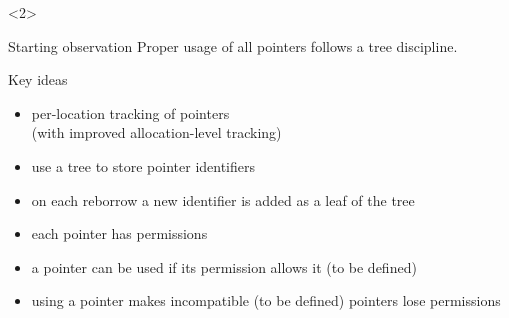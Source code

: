 \begin{frame}[t]
    \begin{onlyenv}<2>
        \begin{block}{Starting observation}
            Proper usage of {\color{red}all pointers} follows a {\color{red}tree} discipline.
        \end{block}
        \begin{block}{Key ideas}
            \begin{itemize}
                \item per-location tracking of pointers\\
                    (with improved allocation-level tracking)
                \item use a {\color{red}tree} to store pointer identifiers
                \item on each reborrow a new identifier is {\color{red}added as a leaf of the tree}
                \item {\color{red}each pointer has permissions}
                \item a pointer can be used {\color{red}if its permission allows it (to be defined)}
                \item using a pointer {\color{red}makes incompatible (to be defined) pointers lose permissions}
            \end{itemize}
        \end{block}
    \end{onlyenv}
\end{frame}

